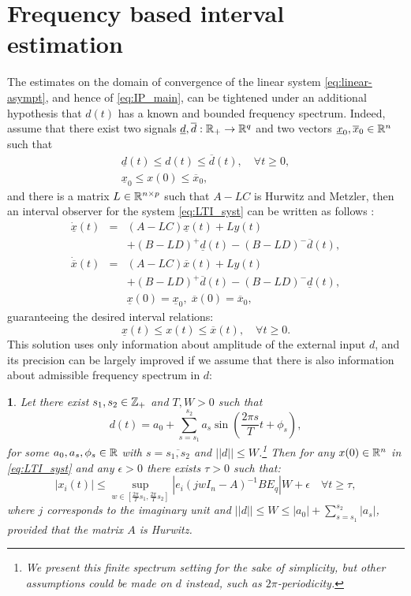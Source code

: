\documentclass[letterpaper, 10 pt, conference]{ieeeconf}
\theoremstyle{plain}
\newtheorem{lem}{\protect\lemmaname}
\theoremstyle{definition}
\theoremstyle{plain}
\theoremstyle{plain}
\theoremstyle{remark}
\providecommand{\lemmaname}{Lemma}
\begin{document}
\section{\label{sec:Frequency} Frequency based interval estimation}
The estimates on the domain of convergence of the linear system \eqref{eq:linear-asympt}, and hence of \eqref{eq:IP_main}, can be tightened under an additional hypothesis that $d(t)$ has a known and bounded frequency spectrum.
Indeed, assume that there exist two signals $\underline{d},\overline{d}:\mathbb{R}_{+}\to\mathbb{R}^{q}$ and two vectors $\underline{x}_{0},\overline{x}_{0}\in\mathbb{R}^{n}$ such that
\begin{gather*}
\underline{d}(t)\leq d(t)\leq\overline{d}(t),\quad\forall t\geq0,\\
\underline{x}_{0}\leq x(0)\leq\overline{x}_{0},
\end{gather*} and there is a matrix $L\in\mathbb{R}^{n\times p}$ such that $A-LC$ is Hurwitz and Metzler, then an interval observer for the system \eqref{eq:LTI_syst} can be written as follows \cite{REZ11}:
\begin{eqnarray}
\dot{\underline{x}}(t) & = & (A-LC)\underline{x}(t)+Ly(t)\nonumber \\
 &  & +(B-LD)^{+}\underline{d}(t)-(B-LD)^{-}\overline{d}(t),\nonumber \\
\dot{\overline{x}}(t) & = & (A-LC)\overline{x}(t)+Ly(t)\label{eq:IO_LTI}\\
 &  & +(B-LD)^{+}\overline{d}(t)-(B-LD)^{-}\underline{d}(t),\nonumber \\
 &  & \underline{x}(0)=\underline{x}_{0},\;\overline{x}(0)=\overline{x}_{0},\nonumber 
\end{eqnarray}
guaranteeing the desired interval relations:
\[
\underline{x}(t)\leq x(t)\leq\overline{x}(t),\quad\forall t\geq0.
\]
This solution uses only information about amplitude of the external input $d$, and its precision can be largely improved if we assume that there is also information about admissible frequency spectrum in $d$:
\begin{lem}
\label{lem:IntFreq} Let there exist $s_{1},s_{2}\in\mathbb{Z}_{+}$ and $T,W>0$
such that
\[
d(t)=a_{0}+\sum_{s=s_{1}}^{s_{2}}a_{s}\sin\left(\frac{2\pi s}{T}t+\phi_{s}\right),
\]
for some $a_{0},a_{s},\phi_{s}\in\mathbb{R}$ with $s=\overline{s_{1},s_{2}}$ and $||d||\leq W$.\footnote{We present this finite spectrum setting for the sake of simplicity, but other assumptions could be made on $d$ instead, such as $2\pi$-periodicity.} Then for any $x(0)\in\mathbb{R}^{n}$ in \eqref{eq:LTI_syst} and any $\epsilon>0$ there exists $\tau>0$ such that:
\[
|x_{i}(t)|\leq\sup_{w\in[\frac{2\pi}{T}s_{1},\frac{2\pi}{T}s_{2}]}|e_{i}(jwI_{n}-A)^{-1}BE_{q}|W+\epsilon\quad\forall t\geq\tau,
\]
where $j$ corresponds to the imaginary unit and $||d||\leq W\leq |a_0|+\sum_{s=s_1}^{s_2} |a_s|$, provided that the matrix $A$ is Hurwitz.
\end{lem}
\end{document}
